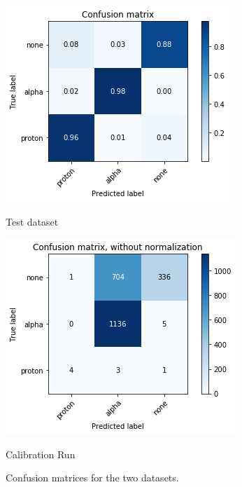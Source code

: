 \begin{figure}[htb]
  \centering
  \begin{minipage}[b]{0.45\textwidth}
    \includegraphics[width=\textwidth]{img/conf_test.png}
    \caption{Test dataset}
    \label{conf_test}
  \end{minipage}
  \hfill
  \begin{minipage}[b]{0.45\textwidth}
   \includegraphics[width=\textwidth]{img/conf_alphas.png}
  \caption{Calibration Run}
  \label{conf_alpha}
  \end{minipage}
  \caption{Confusion matrices for the two datasets.}
  \label{input}
\end{figure}


